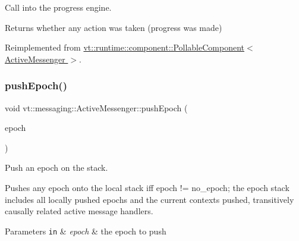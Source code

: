 Call into the progress engine. 

\begin{DoxyReturn}{Returns}
whether any action was taken (progress was made) 
\end{DoxyReturn}


Reimplemented from \hyperlink{structvt_1_1runtime_1_1component_1_1_pollable_component_a34cad810026224d550cd9b0c9d1eff22}{vt\+::runtime\+::component\+::\+Pollable\+Component$<$ Active\+Messenger $>$}.

\mbox{\label{structvt_1_1messaging_1_1_active_messenger_ac60a61b85392a5c40d2334919981963a}} 
\subsubsection{\texorpdfstring{push\+Epoch()}{pushEpoch()}}
{\footnotesize\ttfamily void vt\+::messaging\+::\+Active\+Messenger\+::push\+Epoch (\begin{DoxyParamCaption}\item[{\hyperlink{namespacevt_a81d11b28122d43bf9834577e4a06440f}{Epoch\+Type} const \&}]{epoch }\end{DoxyParamCaption})\hspace{0.3cm}{\ttfamily [inline]}}



Push an epoch on the stack. 

Pushes any epoch onto the local stack iff epoch != no\+\_\+epoch; the epoch stack includes all locally pushed epochs and the current contexts pushed, transitively causally related active message handlers.


\begin{DoxyParams}[1]{Parameters}
\mbox{\tt in}  & {\em epoch} & the epoch to push \\
\hline
\end{DoxyParams}
\mbox{\label{structvt_1_1messaging_1_1_active_messenger_a142aeb4905ce18e3c01250f880bca062}} 
